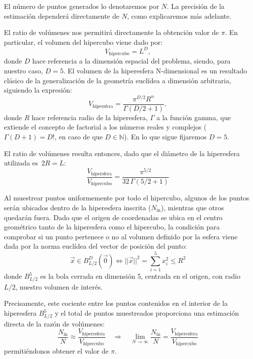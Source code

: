 \documentclass[11pt, a4paper]{article}
\begin{document}
El número de puntos generados lo denotaremos por $N$. La precisión de la estimación dependerá directamente de $N$, como explicaremos más adelante.

El ratio de volúmenes nos permitirá directamente la obtención valor de $\pi$. En particular, el volumen del hipercubo viene dado por:
\begin{equation}
V_{\text{hipercubo}} = L^D,
\end{equation}
donde $D$ hace referencia a la dimensión espacial del problema, siendo, para nuestro caso, $D=5$. El volumen de la hiperesfera N-dimensional es un resultado clásico de la generalización de la geometría euclídea a dimensión arbitraria, siguiendo la expresión:
\begin{equation}
V_{\text{hipersfera}} = \frac{\pi^{D/2} R^n}{\Gamma(D/2 + 1)},
\end{equation}
donde $R$ hace referencia radio de la hiperesfera, $\Gamma$ a la función gamma, que extiende el concepto de factorial a los números reales y complejos ($\Gamma(D+1) = D!$, en caso de que $D\in \mathbb{N}$). En lo que sigue fijaremos $D=5$.

El ratio de volúmenes resulta entonces, dado que el diámetro de la hiperesfera utilizada es~$2R=L$:
\begin{equation}
\frac{V_{\text{hipersfera}}}{V_{\text{hipercubo}}}= \frac{\pi^{5/2}}{32 \, \Gamma(5/2 + 1)}
\end{equation}

Al muestrear puntos uniformemente por todo el hipercubo, algunos de los puntos serán ubicados dentro de la hiperesfera inscrita ($N_{\text{in}}$), mientras que otros quedarán fuera. Dado que el origen de coordenadas se ubica en el centro geométrico tanto de la hiperesfera como el hipercubo, la condición para comprobar si un punto pertenece o no al volumen definido por la esfera viene dada por la norma euclídea del vector de posición del punto:
\begin{equation}
\vec{x} \in B_{L/2}^D(\vec{0}) \iff ||\vec{x}||^2 = \sum_{i=1}^5 x_i^2 \leq R^2
\end{equation}
donde $B_{L/2}^5$ es la bola cerrada en dimensión 5, centrada en el origen, con radio $L/2$, nuestro volumen de interés.

Precisamente, este cociente entre los puntos contenidos en el interior de la hiperesfera $B_{L/2}^5$ y el total de puntos muestreados proporciona una estimación directa de la razón de volúmenes:
\begin{equation}
\frac{N_{\text{in}}}{N} \approx \frac{V_{\text{hiperesfera}}}{V_{\text{hipercubo}}} \quad \Longrightarrow \quad \lim_{N \to \infty} \frac{N_{\text{in}}}{N} = \frac{V_{\text{hiperesfera}}}{V_{\text{hipercubo}}}
\end{equation}
permitiéndonos obtener el valor de $\pi$.
\end{document}
